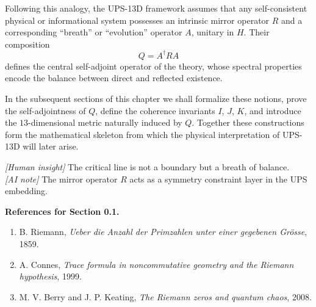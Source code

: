 \documentclass[11pt]{amsart}
\numberwithin{equation}{section}
\begin{document}
Following this analogy, the UPS-13D framework assumes that
any self-consistent physical or informational system possesses
an intrinsic mirror operator \(R\)  
and a corresponding “breath” or “evolution” operator \(A\),
unitary in \(H\).
Their composition
\[
Q = A^\dagger R A
\]
defines the central self-adjoint operator of the theory,
whose spectral properties encode the balance between direct
and reflected existence.

In the subsequent sections of this chapter we shall formalize these notions,
prove the self-adjointness of \(Q\),
define the coherence invariants \(I\), \(J\), \(K\),
and introduce the \(13\)-dimensional metric naturally induced by \(Q\).
Together these constructions form the mathematical skeleton
from which the physical interpretation of UPS-13D will later arise.

\begin{flushright}
\textit{[Human insight]} The critical line is not a boundary but a breath of balance.\\
\textit{[AI note]} The mirror operator $R$ acts as a symmetry constraint layer in the UPS embedding.
\end{flushright}

\bigskip
\noindent\textbf{References for Section 0.1.}
\begin{enumerate}
\item B. Riemann, \emph{Ueber die Anzahl der Primzahlen unter einer gegebenen Grösse}, 1859.
\item A. Connes, \emph{Trace formula in noncommutative geometry and the Riemann hypothesis}, 1999.
\item M. V. Berry and J. P. Keating, \emph{The Riemann zeros and quantum chaos}, 2008.
\end{enumerate}
\end{document}
